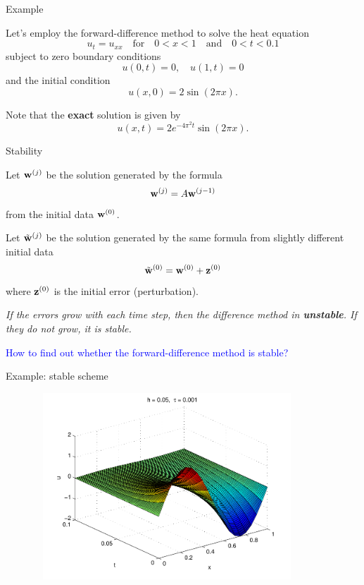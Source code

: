 \documentclass{beamer}
\begin{document}


\begin{frame}{Example}

{\small
Let's employ the forward-difference method to solve the heat equation
\[
u_{t}=u_{xx} \quad \textrm{for} \quad 0<x<1  \quad \textrm{and} \quad 0<t<0.1
\]
subject to zero boundary conditions
\[
u(0,t)=0, \quad u(1,t)=0
\]
and the initial condition
\[
u(x,0)=2\sin(2\pi x).
\]

\vskip 5mm
Note that the \textbf{exact} solution is given by
\[
u(x,t)=2e^{-4\pi^2 t}\sin(2\pi x).
\]

}
\end{frame}

\begin{frame}{Stability}

{\small Let ${\bf w}^{(j)}$ be the solution generated by the formula
\[
{\bf w}^{(j)}=A{\bf w}^{(j-1)}
\]
from the initial data ${\bf w}^{(0)}$.

\vskip 3mm

Let $\tilde{\bf w}^{(j)}$ be the solution generated by the same formula from slightly different
initial data
\[
\tilde{\bf w}^{(0)}={\bf w}^{(0)}+{\bf z}^{(0)}
\]
where ${\bf z}^{(0)}$ is the initial error (perturbation).

\vskip 3mm

\textit{If the errors grow with each time step, then the
difference method in \textbf{unstable}. If they do not grow, it is stable.}

\vskip 3mm

\textcolor{blue}{How to find out whether the forward-difference method is stable?}
}

\end{frame}



\begin{frame}{Example: stable scheme}
\begin{figure}[h]
\centering
\includegraphics[width=10cm,height=7cm]{../Lecture_notes/forward_diff_fig1.pdf}
\end{figure}


\end{frame}
\end{document}

